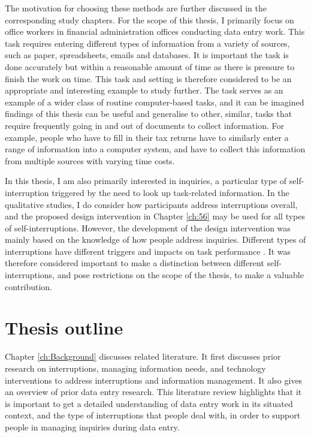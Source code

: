 The motivation for choosing these methods are further discussed in the corresponding study chapters. 
For the scope of this thesis, I primarily focus on office workers in financial administration offices conducting data entry work. This task requires entering different types of information from a variety of sources, such as paper, spreadsheets, emails and databases. It is important the task is done accurately but within a reasonable amount of time as there is pressure to finish the work on time. This task and setting is therefore considered to be an appropriate and interesting example to study further. The task serves as an example of a wider class of routine computer-based tasks, and it can be imagined findings of this thesis can be useful and generalise to other, similar, tasks that require frequently going in and out of documents to collect information. For example, people who have to fill in their tax returns have to similarly enter a range of information into a computer system, and have to collect this information from multiple sources with varying time costs.

In this thesis, I am also primarily interested in inquiries, a particular type of self-interruption triggered by the need to look up task-related information. 
In the qualitative studies, I do consider how participants address interruptions overall, and the proposed design intervention in Chapter \ref{ch:56} may be used for all types of self-interruptions. However, the development of the design intervention was mainly based on the knowledge of how people address inquiries. Different types of interruptions have different triggers and impacts on task performance \citep{Jin2009}. It was therefore considered important to make a distinction between different self-interruptions, and pose restrictions on the scope of the thesis, to make a valuable contribution.

\section{Thesis outline}
Chapter \ref{ch:Background} discusses related literature. It first discusses prior research on interruptions, managing information needs, and technology interventions to address interruptions and information management. It also gives an overview of prior data entry research. This literature review highlights that it is important to get a detailed understanding of data entry work in its situated context, and the type of interruptions that people deal with, in order to support people in managing inquiries during data entry. 

